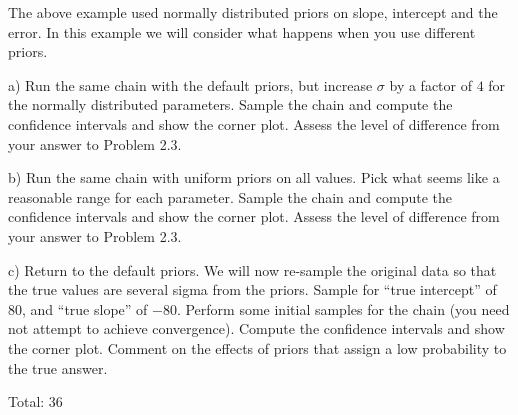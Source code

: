 \documentclass[10pt]{article}
\newenvironment{problem}[2][Problem]{\begin{trivlist}
\item[\hskip \labelsep {\bfseries #1}\hskip \labelsep {\bfseries #2}]}{\end{trivlist}}
\begin{document}
\begin{problem}{2.4 MCMC with different priors (6)}
The above example used normally distributed priors on slope, intercept and the error. In this example we will consider what happens when you use different priors.

a) Run the same chain with the default priors, but increase $\sigma$ by a factor of $4$ for the normally distributed parameters. Sample the chain and compute the confidence intervals and show the corner plot. Assess the level of difference from your answer to Problem 2.3.

b) Run the same chain with uniform priors on all values. Pick what seems like a reasonable range for each parameter. Sample the chain and compute the confidence intervals and show the corner plot. Assess the level of difference from your answer to Problem 2.3.

c) Return to the default priors. We will now re-sample the original data so that the true values are several sigma from the priors. Sample for ``true intercept'' of $80$, and ``true slope'' of $-80$. Perform some initial samples for the chain (you need not attempt to achieve convergence). Compute the confidence intervals and show the corner plot. Comment on the effects of priors that assign a low probability to the true answer.
\end{problem}


Total: 36
\end{document}
